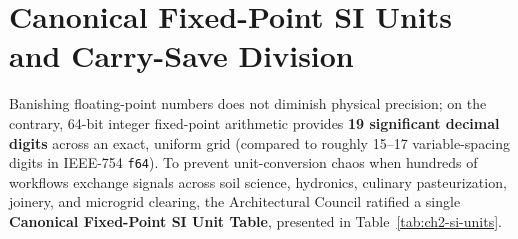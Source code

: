 \section{Canonical Fixed-Point SI Units and Carry-Save Division}
\label{sec:ch2-fixed-point-si}

Banishing floating-point numbers does not diminish physical precision; on the contrary,
64-bit integer fixed-point arithmetic provides \textbf{19 significant decimal digits} across
an exact, uniform grid (compared to roughly 15--17 variable-spacing digits in IEEE-754
\texttt{f64}). To prevent unit-conversion chaos when hundreds of workflows exchange signals
across soil science, hydronics, culinary pasteurization, joinery, and microgrid clearing,
the Architectural Council ratified a single \textbf{Canonical Fixed-Point SI Unit Table},
presented in Table~\ref{tab:ch2-si-units}.


